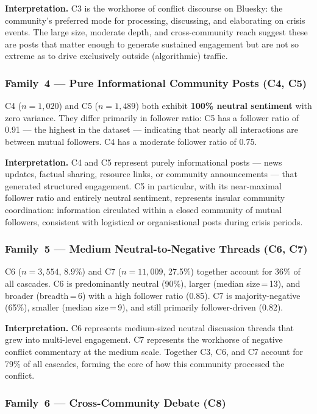 \documentclass[12pt, a4paper]{article}
\begin{document}
\textbf{Interpretation.} C3 is the workhorse of conflict discourse on Bluesky: the community's preferred mode for processing, discussing, and elaborating on crisis events. The large size, moderate depth, and cross-community reach suggest these are posts that matter enough to generate sustained engagement but are not so extreme as to drive exclusively outside (algorithmic) traffic.

\subsubsection*{Family~4 --- Pure Informational Community Posts (C4, C5)}

C4 ($n\!=\!1{,}020$) and C5 ($n\!=\!1{,}489$) both exhibit \textbf{100\% neutral sentiment} with zero variance. They differ primarily in follower ratio: C5 has a follower ratio of 0.91 --- the highest in the dataset --- indicating that nearly all interactions are between mutual followers. C4 has a moderate follower ratio of 0.75.

\textbf{Interpretation.} C4 and C5 represent purely informational posts --- news updates, factual sharing, resource links, or community announcements --- that generated structured engagement. C5 in particular, with its near-maximal follower ratio and entirely neutral sentiment, represents insular community coordination: information circulated within a closed community of mutual followers, consistent with logistical or organisational posts during crisis periods.

\subsubsection*{Family~5 --- Medium Neutral-to-Negative Threads (C6, C7)}

C6 ($n\!=\!3{,}554$, 8.9\%) and C7 ($n\!=\!11{,}009$, 27.5\%) together account for 36\% of all cascades. C6 is predominantly neutral (90\%), larger (median size\,=\,13), and broader (breadth\,=\,6) with a high follower ratio (0.85). C7 is majority-negative (65\%), smaller (median size\,=\,9), and still primarily follower-driven (0.82).

\textbf{Interpretation.} C6 represents medium-sized neutral discussion threads that grew into multi-level engagement. C7 represents the workhorse of negative conflict commentary at the medium scale. Together C3, C6, and C7 account for 79\% of all cascades, forming the core of how this community processed the conflict.

\subsubsection*{Family~6 --- Cross-Community Debate (C8)}
\end{document}
